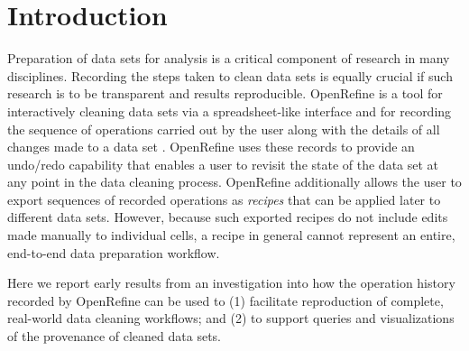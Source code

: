 \section{Introduction}

Preparation of data sets for analysis is a critical component of research in many disciplines. Recording the steps taken to clean data sets is equally crucial if such research is to be transparent and results reproducible. OpenRefine is a tool for interactively cleaning data sets via a spreadsheet-like interface and for recording the sequence of operations carried out by the user along with the details of all changes made to a data set \cite{verborgh_using_2013}. OpenRefine uses these records to provide an undo/redo capability that enables a user to revisit the state of the data set at any point in the data cleaning process. OpenRefine additionally allows the user to export sequences of recorded operations as \emph{recipes} that can be applied later to different data sets. However, because such exported recipes do not include edits made manually to individual cells, a recipe in general cannot represent an entire, end-to-end data preparation workflow. 

Here we report early results from an investigation into how the operation history recorded by OpenRefine can be used to (1) facilitate reproduction of complete, real-world data cleaning workflows; and (2) to support queries and visualizations of the provenance of cleaned data sets.
